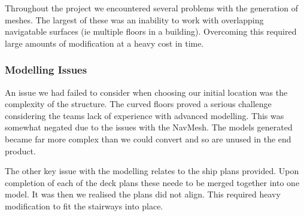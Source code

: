 Throughout the project we encountered several problems with the generation
of meshes. The largest of these was an inability to work with overlapping
navigatable surfaces (ie multiple floors in a building). Overcoming
this required large amounts of modification at a heavy cost in time.


\subsubsection{Modelling Issues}

An issue we had failed to consider when choosing our initial location
was the complexity of the structure. The curved floors proved a serious
challenge considering the teams lack of experience with advanced modelling.
This was somewhat negated due to the issues with the NavMesh. The
models generated became far more complex than we could convert and
so are unused in the end product.

The other key issue with the modelling relates to the ship plans provided.
Upon completion of each of the deck plans these neede to be merged
together into one model. It was then we realised the plans did not
align. This required heavy modification to fit the stairways into
place.


